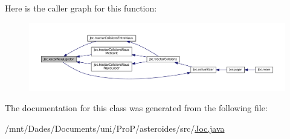 Here is the caller graph for this function\+:
\nopagebreak
\begin{figure}[H]
\begin{center}
\leavevmode
\includegraphics[width=350pt]{class_joc_a471c58ad94b7a8732a6b3e4695f2a691_icgraph}
\end{center}
\end{figure}




The documentation for this class was generated from the following file\+:\begin{DoxyCompactItemize}
\item 
/mnt/\+Dades/\+Documents/uni/\+Pro\+P/asteroides/src/\hyperlink{_joc_8java}{Joc.\+java}\end{DoxyCompactItemize}
